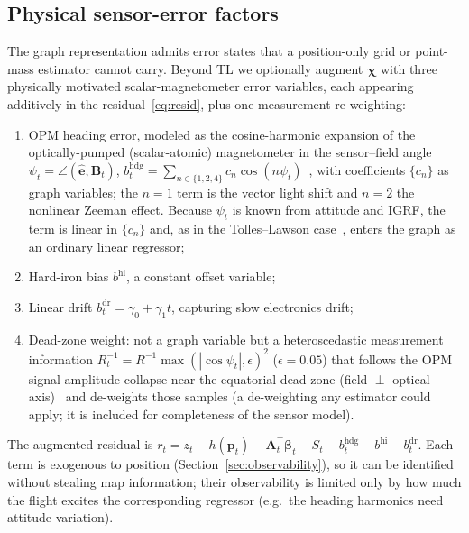\documentclass{IEEEtaes}
\begin{document}
\subsection{Physical sensor-error factors}
The graph representation admits error states that a position-only grid or
point-mass estimator cannot carry. Beyond TL we optionally augment
$\boldsymbol{\chi}$ with three physically motivated scalar-magnetometer error
variables, each appearing additively in the residual~\eqref{eq:resid}, plus one
measurement re-weighting:
\begin{enumerate}
\item OPM heading error, modeled as the cosine-harmonic expansion of the
optically-pumped (scalar-atomic) magnetometer in the sensor--field angle
$\psi_t=\angle(\hat{\mathbf{e}},\mathbf{B}_t)$,
$b^{\mathrm{hdg}}_t=\sum_{n\in\{1,2,4\}}c_n\cos(n\psi_t)$~\cite{hager2026b,wang2020},
with coefficients $\{c_n\}$ as graph variables; the $n{=}1$ term is the vector
light shift and $n{=}2$ the nonlinear Zeeman effect. Because $\psi_t$ is known
from attitude and IGRF, the term is linear in $\{c_n\}$ and, as in the
Tolles--Lawson case~\cite{wang2020}, enters the graph as an ordinary linear
regressor;
\item Hard-iron bias $b^{\mathrm{hi}}$, a constant offset variable;
\item Linear drift $b^{\mathrm{dr}}_t=\gamma_0+\gamma_1 t$, capturing slow
electronics drift;
\item Dead-zone weight: not a graph variable but a heteroscedastic
measurement information $R_t^{-1}=R^{-1}\max(|\cos\psi_t|,\epsilon)^2$
($\epsilon{=}0.05$) that follows the OPM signal-amplitude collapse near the
equatorial dead zone (field $\perp$ optical axis)~\cite{hager2026b} and
de-weights those samples (a de-weighting any estimator could apply; it is
included for completeness of the sensor model).
\end{enumerate}
The augmented residual is $r_t=z_t-h(\mathbf{p}_t)-\mathbf{A}_t^{\top}\boldsymbol{\beta}_t
-S_t-b^{\mathrm{hdg}}_t-b^{\mathrm{hi}}-b^{\mathrm{dr}}_t$. Each term is exogenous to
position (Section~\ref{sec:observability}), so it can be identified without stealing
map information; their observability is limited only by how much the flight excites
the corresponding regressor (e.g.\ the heading harmonics need attitude variation).
\end{document}
